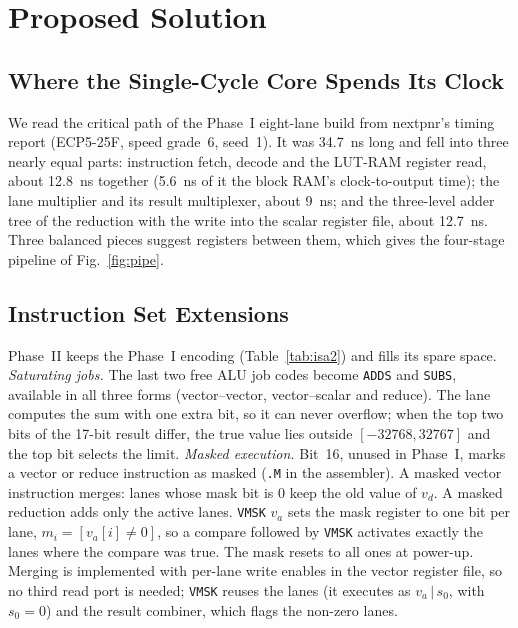 \section{Proposed Solution}\label{sec:design}

\subsection{Where the Single-Cycle Core Spends Its Clock}\label{sec:why}
We read the critical path of the Phase~I eight-lane build from nextpnr's timing report
(ECP5-25F, speed grade~6, seed~1). It was 34.7~ns long and fell into three nearly equal
parts: instruction fetch, decode and the LUT-RAM register read, about 12.8~ns together
(5.6~ns of it the block RAM's clock-to-output time); the lane multiplier and its result
multiplexer, about 9~ns; and the three-level adder tree of the reduction with the write
into the scalar register file, about 12.7~ns. Three balanced pieces suggest registers
between them, which gives the four-stage pipeline of Fig.~\ref{fig:pipe}.

\subsection{Instruction Set Extensions}\label{sec:isa}
Phase~II keeps the Phase~I encoding (Table~\ref{tab:isa2}) and fills its spare space.
\emph{Saturating jobs.} The last two free ALU job codes become \texttt{ADDS} and
\texttt{SUBS}, available in all three forms (vector--vector, vector--scalar and reduce).
The lane computes the sum with one extra bit, so it can never overflow; when the top two
bits of the 17-bit result differ, the true value lies outside $[-32768, 32767]$ and the
top bit selects the limit.
\emph{Masked execution.} Bit~16, unused in Phase~I, marks a vector or reduce
instruction as masked (\texttt{.M} in the assembler). A masked vector instruction
merges: lanes whose mask bit is 0 keep the old value of $v_d$. A masked reduction adds
only the active lanes. \texttt{VMSK} $v_a$ sets the mask register to one bit per lane,
$m_i = [v_a[i] \neq 0]$, so a compare followed by \texttt{VMSK} activates exactly the
lanes where the compare was true. The mask resets to all ones at power-up.
Merging is implemented with per-lane write enables in the vector register file, so no
third read port is needed; \texttt{VMSK} reuses the lanes (it executes as
$v_a \,|\, s_0$, with $s_0 = 0$) and the result combiner, which flags the non-zero lanes.

